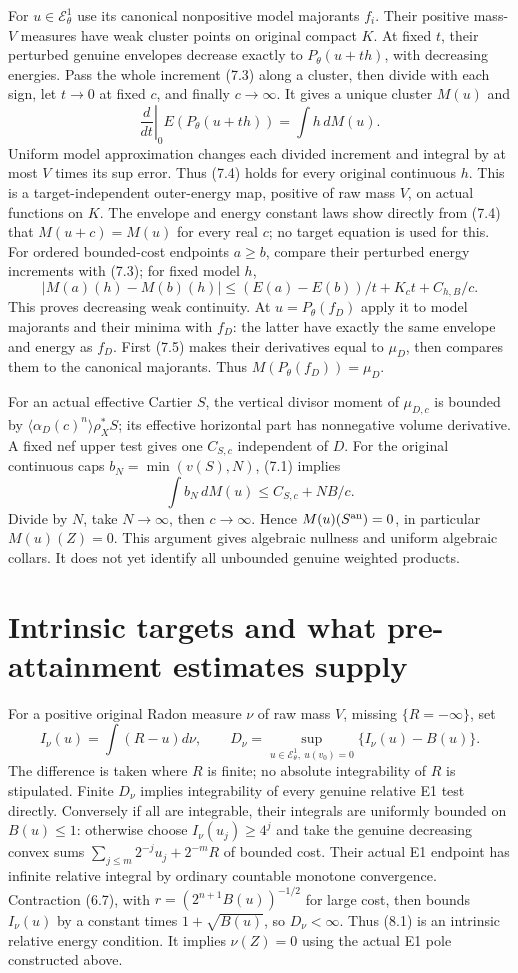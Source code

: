 \documentclass[10pt]{article}
\newcommand{\EE}{\mathcal E^1_\theta}
\begin{document}
For $u\in\EE$ use its canonical nonpositive model majorants $f_i$.
Their positive mass-$V$ measures have weak cluster points on original
compact $K$. At fixed $t$, their perturbed genuine envelopes decrease
exactly to $P_\theta(u+th)$, with decreasing energies. Pass the whole
increment (7.3) along a cluster, then divide with each sign, let $t\to0$
at fixed $c$, and finally $c\to\infty$. It gives a unique cluster $M(u)$
and
\[
 \left.\frac d{dt}\right|_0E(P_\theta(u+th))=\int h\,dM(u).
 \tag{7.4}
\]
Uniform model approximation changes each divided increment and integral
by at most $V$ times its sup error. Thus (7.4) holds for every original
continuous $h$. This is a target-independent outer-energy map, positive
of raw mass $V$, on actual functions on $K$.
The envelope and energy constant laws show directly from (7.4) that
$M(u+c)=M(u)$ for every real $c$; no target equation is used for this.
For ordered bounded-cost endpoints $a\geq b$, compare their perturbed
energy increments with (7.3); for fixed model $h$,
\[
 |M(a)(h)-M(b)(h)|\leq (E(a)-E(b))/t+K_ct+C_{h,B}/c.
 \tag{7.5}
\]
This proves decreasing weak continuity. At $u=P_\theta(f_D)$ apply
it to model majorants and their minima with $f_D$: the latter have
exactly the same envelope and energy as $f_D$. First (7.5) makes their
derivatives equal to $\mu_D$, then compares them to the canonical
majorants. Thus $M(P_\theta(f_D))=\mu_D$.

For an actual effective Cartier $S$, the vertical divisor moment of
$\mu_{D,c}$ is bounded by
$\langle\alpha_D(c)^n\rangle\rho_X^*S$; its effective horizontal
part has nonnegative volume derivative. A fixed nef upper test gives
one $C_{S,c}$ independent of $D$. For the original continuous caps
$b_N=\min(v(S),N)$, (7.1) implies
\[
 \int b_N\,dM(u)\leq C_{S,c}+NB/c.
 \tag{7.6}
\]
Divide by $N$, take $N\to\infty$, then $c\to\infty$.
Hence $M(u)(S^{\rm an})=0$, in particular $M(u)(Z)=0$.
This argument gives algebraic nullness and uniform algebraic collars.
It does not yet identify all unbounded genuine weighted products.

\section{Intrinsic targets and what pre-attainment estimates supply}
For a positive original Radon measure $\nu$ of raw mass $V$, missing
$\{R=-\infty\}$, set
\[
 I_\nu(u)=\int(R-u)d\nu,\qquad
 D_\nu=\sup_{u\in\EE,\ u(v_0)=0}\{I_\nu(u)-B(u)\}.
 \tag{8.1}
\]
The difference is taken where $R$ is finite; no absolute integrability
of $R$ is stipulated. Finite $D_\nu$ implies integrability of every
genuine relative E1 test directly. Conversely if all are integrable,
their integrals are uniformly bounded on $B(u)\leq1$: otherwise choose
$I_\nu(u_j)\geq4^j$ and take the genuine decreasing convex sums
$\sum_{j\leq m}2^{-j}u_j+2^{-m}R$ of bounded cost. Their actual E1
endpoint has infinite relative integral by ordinary countable monotone
convergence. Contraction (6.7), with $r=(2^{n+1}B(u))^{-1/2}$ for
large cost, then bounds $I_\nu(u)$ by a constant times $1+\sqrt{B(u)}$,
so $D_\nu<\infty$. Thus (8.1) is an intrinsic relative energy condition.
It implies $\nu(Z)=0$ using the actual E1 pole constructed above.
\end{document}
